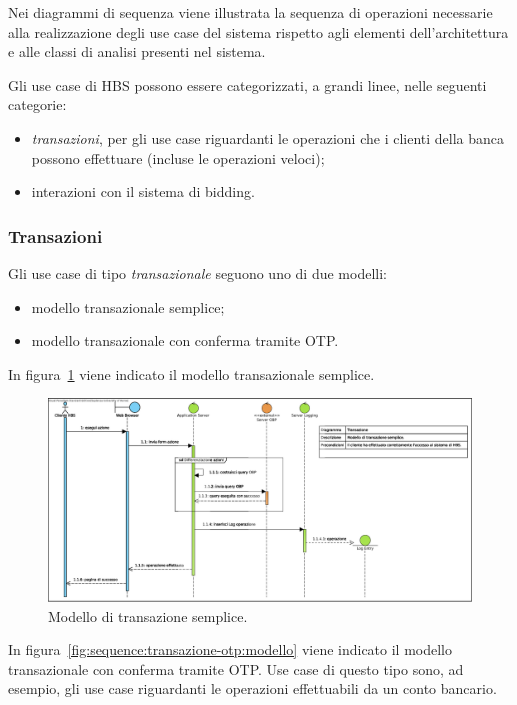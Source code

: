 
Nei diagrammi di sequenza viene illustrata la sequenza di operazioni necessarie alla realizzazione degli use case del sistema rispetto agli elementi dell'architettura e alle classi di analisi presenti nel sistema.

Gli use case di HBS possono essere categorizzati, a grandi linee, nelle seguenti categorie:
\begin{itemize}
	\item \emph{transazioni}, per gli use case riguardanti le operazioni che i clienti della banca possono effettuare (incluse le operazioni veloci);

	\item interazioni con il sistema di bidding.
\end{itemize}

\subsubsection{Transazioni}

Gli use case di tipo \emph{transazionale} seguono uno di due modelli:
\begin{itemize}
	\item modello transazionale semplice;

	\item modello transazionale con conferma tramite OTP.
\end{itemize}

In figura~\ref{fig:sequence:transazione:modello} viene indicato il modello transazionale semplice.

\begin{figure}[h]
	\centering
	\includegraphics[width=\textwidth]{Images/sequence/Transazione.eps}
	\caption{Modello di transazione semplice.}
	\label{fig:sequence:transazione:modello}
\end{figure}

In figura~\ref{fig:sequence:transazione-otp:modello} viene indicato il modello transazionale con conferma tramite OTP.
Use case di questo tipo sono, ad esempio, gli use case riguardanti le operazioni effettuabili da un conto bancario.

